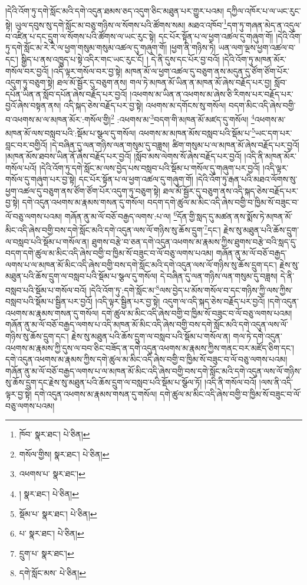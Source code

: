 །དེའི་འོག་ཏུ་དགེ་སློང་མའི་དགེ་འདུན་ཐམས་ཅད་འདུག་ཅིང་མཐུན་པར་གྱུར་པའམ། དཀྱིལ་འཁོར་པ་ལ་ཡང་རུང་སྟེ། ཡུལ་དབུས་སུ་དགེ་སློང་མ་བཅུ་གཉིས་ལ་སོགས་པའི་ཚོགས་སམ། མཐའ་འཁོབ་\footnote{ཁོབ་  སྣར་ཐང་།  པེ་ཅིན། }དག་ཏུ་གཞན་མེད་ན་འདུལ་བ་འཛིན་པ་དང་དྲུག་ལ་སོགས་པའི་ཚོགས་ལ་ཡང་རུང་སྟེ། དང་པོར་སྟོན་པ་ལ་ཕྱག་འཚལ་དུ་གཞུག་གོ། །དེའི་འོག་ཏུ་དགེ་སློང་མ་རེ་རེ་ལ་ཕྱག་གསུམ་གསུམ་འཚལ་དུ་གཞུག་གོ། །ཕྱག་ནི་གཉིས་ཏེ། ཡན་ལག་ལྔས་ཕྱག་འཚལ་བ་དང་། སྒྱིད་པ་ནས་འཁྱུད་པ་སྟེ་འདིར་གང་ཡང་རུང་ངོ། །
དེ་ནི་དུས་དང་པོར་བྱ་བའོ། །དེའི་འོག་ཏུ་མཁན་མོར་གསོལ་བར་བྱའོ། །འདི་ལྟར་གསོལ་བར་བྱ་སྟེ། མཁན་མོ་ལ་ཕྱག་འཚལ་དུ་བཅུག་ནས་མདུན་དུ་ཙོག་ཙོག་པོར་འདུག་ཏུ་བཅུག་སྟེ། ཐལ་མོ་སྦྱོར་དུ་བཅུག་ནས། གལ་ཏེ་མཁན་མོ་ཡིན་ན་མཁན་མོ་ཞེས་བརྗོད་པར་བྱ། སློབ་དཔོན་ཡིན་ན་སློབ་དཔོན་ཞེས་བརྗོད་པར་བྱའོ། །འཕགས་མ་ཡིན་ན་འཕགས་མ་ཞེས་ཅི་རིགས་པར་བརྗོད་པར་བྱའོ་ཞེས་བསྟན་ནས། འདི་སྐད་ཅེས་བརྗོད་པར་བྱ་སྟེ། འཕགས་མ་དགོངས་སུ་གསོལ། བདག་མིང་འདི་ཞེས་བགྱི་བ་འཕགས་མ་ལ་མཁན་མོར་:གསོལ་གྱི།\footnote{གསོལ་གྱིས།  སྣར་ཐང་།  པེ་ཅིན། } :འཕགས་མ་\footnote{འཕགས་པ་  སྣར་ཐང་། }བདག་གི་མཁན་མོ་མཛད་དུ་གསོལ། \footnote{།    སྣར་ཐང་།  པེ་ཅིན། }འཕགས་མ་མཁན་མོ་ལས་བསླབ་པའི་:སྡོམ་པ་སྩལ་དུ་གསོལ། འཕགས་མ་མཁན་མོས་བསླབ་པའི་སྡོམ་པ་\footnote{སྡོམ་པ་  སྣར་ཐང་།  པེ་ཅིན། }ཡང་དག་པར་བླང་བར་བགྱིའོ། །དེ་བཞིན་དུ་ལན་གཉིས་ལན་གསུམ་དུ་བཟླས། ཚིག་གསུམ་པ་ལ་མཁན་མོ་ཞེས་བརྗོད་པར་བྱའོ། །མཁན་མོས་ཐབས་ཡིན་ནོ་ཞེས་བརྗོད་པར་བྱའོ། །སློབ་མས་ལེགས་སོ་ཞེས་བརྗོད་པར་བྱའོ། །འདི་ནི་མཁན་མོར་གསོལ་པའོ། །དེའི་འོག་ཏུ་དགེ་སློང་མ་ལས་བྱེད་པས་བསླབ་པའི་སྡོམ་པ་གསོལ་དུ་གཞུག་པར་བྱའོ། །འདི་ལྟར་གསོལ་དུ་གཞུག་པར་བྱ་སྟེ། དང་པོར་སྟོན་པ་ལ་ཕྱག་འཚལ་དུ་གཞུག་གོ། །དེའི་འོག་ཏུ་རྒན་པའི་མཐའ་ལོགས་སུ་ཕྱག་འཚལ་དུ་བཅུག་ནས་ཙོག་ཙོག་པོར་འདུག་ཏུ་བཅུག་སྟེ། ཐལ་མོ་སྦྱོར་དུ་བཅུག་ནས་འདི་སྐད་ཅེས་བརྗོད་པར་བྱ་སྟེ། དགེ་འདུན་འཕགས་མ་རྣམས་གསན་དུ་གསོལ། བདག་དགེ་ཚུལ་མ་མིང་འདི་ཞེས་བགྱི་བ་ཁྱིམ་སོ་བཟུང་བ་ལོ་བཅུ་ལགས་པའམ། གཞོན་ནུ་མ་ལོ་བཅོ་བརྒྱད་ལགས་:པ་ལ། \footnote{པ་  སྣར་ཐང་།  པེ་ཅིན། }དོན་གྱི་སླད་དུ་མཚན་ནས་སྨོས་ཏེ་མཁན་མོ་མིང་འདི་ཞེས་བགྱི་བས་དགེ་སློང་མའི་དགེ་འདུན་ལས་ལོ་གཉིས་སུ་ཆོས་དྲུག་\footnote{དྲུག་པ་  སྣར་ཐང་། }དང་། རྗེས་སུ་མཐུན་པའི་ཆོས་དྲུག་ལ་བསླབ་པའི་སྡོམ་པ་གསོལ་ན། ཐུགས་བརྩེ་བ་ཅན་དགེ་འདུན་འཕགས་མ་རྣམས་ཀྱིས་ཐུགས་བརྩེ་བའི་སླད་དུ་བདག་དགེ་ཚུལ་མ་མིང་འདི་ཞེས་བགྱི་བ་ཁྱིམ་སོ་བཟུང་བ་ལོ་བཅུ་ལགས་པའམ། གཞོན་ནུ་མ་ལོ་བཅོ་བརྒྱད་ལགས་པ་ལ་མཁན་མོ་མིང་འདི་ཞེས་བགྱི་བས་དགེ་སློང་མའི་དགེ་འདུན་ལས་ལོ་གཉིས་སུ་ཆོས་དྲུག་དང་། རྗེས་སུ་མཐུན་པའི་ཆོས་དྲུག་ལ་བསླབ་པའི་སྡོམ་པ་སྩལ་དུ་གསོལ། དེ་བཞིན་དུ་ལན་གཉིས་ལན་གསུམ་དུ་བཟླས། དེ་ནི་བསླབ་པའི་སྡོམ་པ་གསོལ་བའོ། །དེའི་འོག་ཏུ་:དགེ་སློང་མ་\footnote{དགེ་སློང་མས་  པེ་ཅིན། }ལས་བྱེད་པ་མོས་གསོལ་བ་དང་གཉིས་ཀྱི་ལས་ཀྱིས་བསླབ་པའི་སྡོམ་པ་སྦྱིན་པར་བྱའོ། །འདི་ལྟར་སྦྱིན་པར་བྱ་སྟེ། འདུག་ལ་འདི་སྐད་ཅེས་བརྗོད་པར་བྱའོ། །དགེ་འདུན་འཕགས་མ་རྣམས་གསན་དུ་གསོལ། དགེ་ཚུལ་མ་མིང་འདི་ཞེས་བགྱི་བ་ཁྱིམ་སོ་བཟུང་བ་ལོ་བཅུ་ལགས་པའམ། གཞོན་ནུ་མ་ལོ་བཅོ་བརྒྱད་ལགས་པ་འདི་མཁན་མོ་མིང་འདི་ཞེས་བགྱི་བས་དགེ་སློང་མའི་དགེ་འདུན་ལས་ལོ་གཉིས་སུ་ཆོས་དྲུག་དང་། རྗེས་སུ་མཐུན་པའི་ཆོས་དྲུག་ལ་བསླབ་པའི་སྡོམ་པ་གསོལ་ན། གལ་ཏེ་དགེ་འདུན་འཕགས་མ་རྣམས་ཀྱི་དུས་ལ་བབ་ཅིང་བཟོད་ན་དགེ་འདུན་འཕགས་མ་རྣམས་ཀྱིས་གནང་བར་མཛོད་ཅིག་དང་། དགེ་འདུན་འཕགས་མ་རྣམས་ཀྱིས་དགེ་ཚུལ་མ་མིང་འདི་ཞེས་བགྱི་བ་ཁྱིམ་སོ་བཟུང་བ་ལོ་བཅུ་ལགས་པའམ། གཞོན་ནུ་མ་ལོ་བཅོ་བརྒྱད་ལགས་པ་ལ་མཁན་མོ་མིང་འདི་ཞེས་བགྱི་བས་དགེ་སློང་མའི་དགེ་འདུན་ལས་ལོ་གཉིས་སུ་ཆོས་དྲུག་དང་རྗེས་སུ་མཐུན་པའི་ཆོས་དྲུག་ལ་བསླབ་པའི་སྡོམ་པ་སྩོལ་ཏོ། །འདི་ནི་གསོལ་བའོ། །ལས་ནི་འདི་ལྟར་བྱ་སྟེ། དགེ་འདུན་འཕགས་མ་རྣམས་གསན་དུ་གསོལ། དགེ་ཚུལ་མ་མིང་འདི་ཞེས་བགྱི་བ་ཁྱིམ་སོ་བཟུང་བ་ལོ་བཅུ་ལགས་པའམ། 